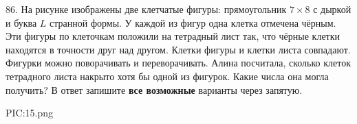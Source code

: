 86. На рисунке изображены две клетчатые фигуры: прямоугольник $7\times8$ с дыркой и буква $L$ странной формы. У каждой из фигур одна клетка отмечена чёрным. Эти фигуры по клеточкам положили на тетрадный лист так, что чёрные клетки находятся в точности друг над другом. Клетки фигуры и клетки листа совпадают. Фигурки можно поворачивать и переворачивать. Алина посчитала, сколько клеток тетрадного листа накрыто хотя бы одной из фигурок. Какие числа она могла получить? В ответ запишите {\bf все возможные} варианты через запятую.
\begin{center}
{{PIC:15.png}}
\end{center}

